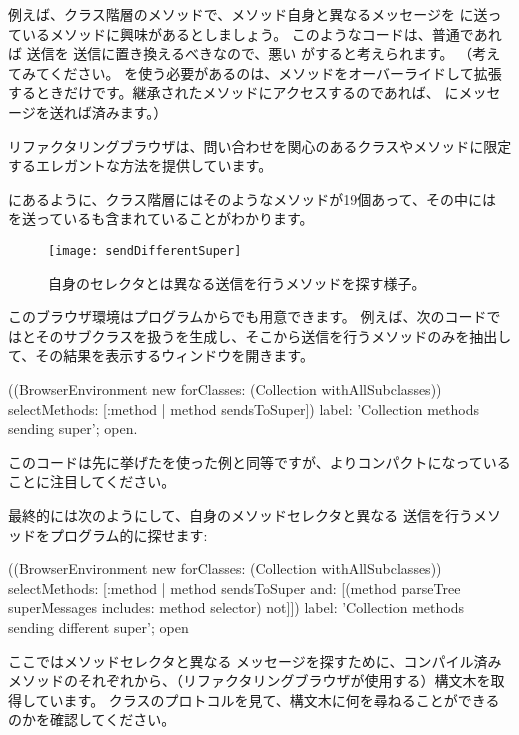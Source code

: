 \documentclass[a4paper,10pt,twoside]{book}
\begin{document}
例えば、クラス階層のメソッドで、メソッド自身と異なるメッセージを \super に送っているメソッドに興味があるとしましょう。
このようなコードは、普通であれば \super 送信を \self 送信に置き換えるべきなので、悪い  がすると考えられます。 （考えてみてください。 \super を使う必要があるのは、メソッドをオーバーライドして拡張するときだけです。継承されたメソッドにアクセスするのであれば、 \self にメッセージを送れば済みます。）

リファクタリングブラウザは、問い合わせを関心のあるクラスやメソッドに限定するエレガントな方法を提供しています。


にあるように、クラス階層にはそのようなメソッドが19個あって、その中には を送っているも含まれていることがわかります。
\begin{figure}[ht]\centering
	\texttt{[image: sendDifferentSuper]}
	\caption{自身のセレクタとは異なる\super 送信を行うメソッドを探す様子。}
\end{figure}

このブラウザ環境はプログラムからでも用意できます。
例えば、次のコードではとそのサブクラスを扱うを生成し、そこから\super 送信を行うメソッドのみを抽出して、その結果を表示するウィンドウを開きます。
\begin{code}{}
((BrowserEnvironment new forClasses: (Collection withAllSubclasses))
	selectMethods: [:method | method sendsToSuper])
	label: 'Collection methods sending super';
	open.
\end{code}{}

このコードは先に挙げたを使った例と同等ですが、よりコンパクトになっていることに注目してください。

最終的には次のようにして、自身のメソッドセレクタと異なる \super 送信を行うメソッドをプログラム的に探せます:
\begin{code}{}
((BrowserEnvironment new forClasses: (Collection withAllSubclasses))
	selectMethods: [:method | 
		method sendsToSuper
		and: [(method parseTree superMessages includes: method selector) not]])
	label: 'Collection methods sending different super';
	open
\end{code}
ここではメソッドセレクタと異なる \super メッセージを探すために、コンパイル済みメソッドのそれぞれから、（リファクタリングブラウザが使用する）構文木を取得しています。
クラスのプロトコルを見て、構文木に何を尋ねることができるのかを確認してください。
\end{document}
